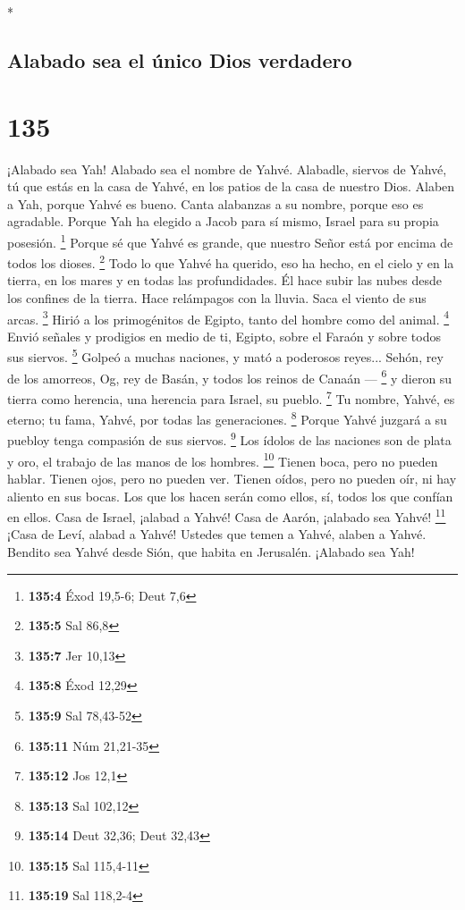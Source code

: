\begin{paracol}{2}
\begin{otherlanguage}{english}
\end{otherlanguage}

\switchcolumn[0]*

\hypertarget{alabado-sea-el-uxfanico-dios-verdadero}{%
\subsection{Alabado sea el único Dios
verdadero}\label{alabado-sea-el-uxfanico-dios-verdadero}}

\hypertarget{section-268}{%
\section{135}\label{section-268}}

 ¡Alabado sea Yah! Alabado sea el nombre de Yahvé.
Alabadle, siervos de Yahvé,  tú que estás en la casa de
Yahvé, en los patios de la casa de nuestro Dios.  Alaben a
Yah, porque Yahvé es bueno. Canta alabanzas a su nombre, porque eso es
agradable.  Porque Yah ha elegido a Jacob para sí mismo,
Israel para su propia posesión. \footnote{\textbf{135:4} Éxod 19,5-6;
  Deut 7,6}  Porque sé que Yahvé es grande, que nuestro
Señor está por encima de todos los dioses. \footnote{\textbf{135:5} Sal
  86,8}  Todo lo que Yahvé ha querido, eso ha hecho, en el
cielo y en la tierra, en los mares y en todas las profundidades.
 Él hace subir las nubes desde los confines de la tierra.
Hace relámpagos con la lluvia. Saca el viento de sus arcas. \footnote{\textbf{135:7}
  Jer 10,13}  Hirió a los primogénitos de Egipto, tanto
del hombre como del animal. \footnote{\textbf{135:8} Éxod 12,29}
 Envió señales y prodigios en medio de ti, Egipto, sobre
el Faraón y sobre todos sus siervos. \footnote{\textbf{135:9} Sal
  78,43-52}  Golpeó a muchas naciones, y mató a poderosos
reyes...  Sehón, rey de los amorreos, Og, rey de Basán, y
todos los reinos de Canaán --- \footnote{\textbf{135:11} Núm 21,21-35}
 y dieron su tierra como herencia, una herencia para
Israel, su pueblo. \footnote{\textbf{135:12} Jos 12,1} 
Tu nombre, Yahvé, es eterno; tu fama, Yahvé, por todas las generaciones.
\footnote{\textbf{135:13} Sal 102,12}  Porque Yahvé
juzgará a su puebloy tenga compasión de sus siervos. \footnote{\textbf{135:14}
  Deut 32,36; Deut 32,43}  Los ídolos de las naciones son
de plata y oro, el trabajo de las manos de los hombres. \footnote{\textbf{135:15}
  Sal 115,4-11}  Tienen boca, pero no pueden hablar.
Tienen ojos, pero no pueden ver.  Tienen oídos, pero no
pueden oír, ni hay aliento en sus bocas.  Los que los
hacen serán como ellos, sí, todos los que confían en ellos.
 Casa de Israel, ¡alabad a Yahvé! Casa de Aarón, ¡alabado
sea Yahvé! \footnote{\textbf{135:19} Sal 118,2-4}  ¡Casa
de Leví, alabad a Yahvé! Ustedes que temen a Yahvé, alaben a Yahvé.
 Bendito sea Yahvé desde Sión, que habita en Jerusalén.
¡Alabado sea Yah!


\end{paracol}
